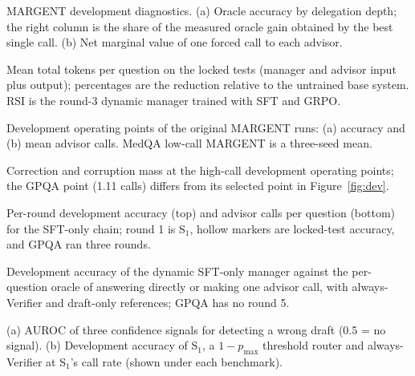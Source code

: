 \caption{MARGENT development diagnostics. (a) Oracle accuracy by delegation depth; the right column is the share of the
measured oracle gain obtained by the best single call. (b) Net marginal value of one forced call to each advisor.}
\label{fig:value}

\caption{Mean total tokens per question on the locked tests (manager and advisor input plus output); percentages are the
reduction relative to the untrained base system. RSI is the round-3 dynamic manager trained with SFT and GRPO.}
\label{fig:tokens}

\caption{Development operating points of the original MARGENT runs: (a) accuracy and (b) mean advisor calls. MedQA low-call MARGENT is a three-seed mean.}
\label{fig:dev}

\caption{Correction and corruption mass at the high-call development operating points; the GPQA point (1.11 calls) differs
from its selected point in Figure~\ref{fig:dev}.}
\label{fig:outcomes}

\caption{Per-round development accuracy (top) and advisor calls per question (bottom) for the SFT-only chain; round 1 is S$_1$,
hollow markers are locked-test accuracy, and GPQA ran three rounds.}
\label{fig:rounds}

\caption{Development accuracy of the dynamic SFT-only manager against the per-question oracle of answering directly or making one
advisor call, with always-Verifier and draft-only references; GPQA has no round 5.}
\label{fig:oracle}

\caption{(a) AUROC of three confidence signals for detecting a wrong draft (0.5 = no signal). (b) Development accuracy of S$_1$,
a $1-p_{\max}$ threshold router and always-Verifier at S$_1$'s call rate (shown under each benchmark).}
\label{fig:selfcheck}
